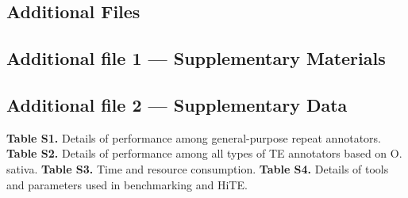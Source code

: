 \documentclass{bmcart}
\begin{document}
\begin{backmatter}

\section*{Additional Files}
  \subsection*{Additional file 1 --- Supplementary Materials}

  \subsection*{Additional file 2 --- Supplementary Data}
    \textbf{Table S1.} Details of performance among general-purpose repeat annotators. \textbf{Table S2.} Details of performance among all types of TE annotators based on O. sativa. \textbf{Table S3.} Time and resource consumption. \textbf{Table S4.} Details of tools and parameters used in benchmarking and HiTE.
    
\end{backmatter}
\end{document}
